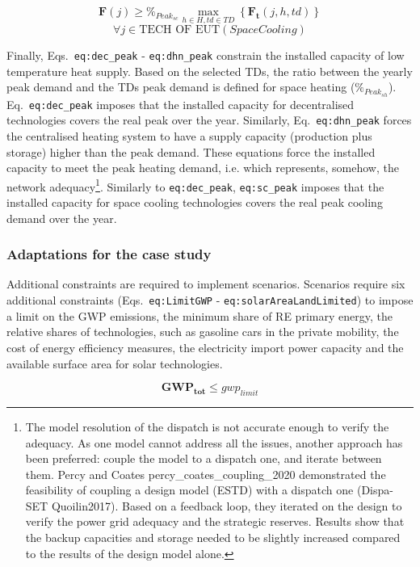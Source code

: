 \documentclass[
]{article}
\begin{document}
{\[\textbf{F} (j) 
\geq
\%_{Peak_{sc}}\max_{h\in H,td\in TD}\left\{\textbf{F}_\textbf{t}(j,h,td)\right\}\]\[\forall j \in \text{TECH OF  EUT} (SpaceCooling)\]}

Finally, Eqs.~\texttt{eq:dec\_peak} - \texttt{eq:dhn\_peak} constrain
the installed capacity of low temperature heat supply. Based on the
selected TDs, the ratio between the yearly peak demand and the TDs peak
demand is defined for space heating (\(\%_{Peak_{sh}}\)).
Eq.~\texttt{eq:dec\_peak} imposes that the installed capacity for
decentralised technologies covers the real peak over the year.
Similarly, Eq.~\texttt{eq:dhn\_peak} forces the centralised heating
system to have a supply capacity (production plus storage) higher than
the peak demand. These equations force the installed capacity to meet
the peak heating demand, i.e. which represents, somehow, the network
adequacy\footnote{The model resolution of the dispatch is not accurate
  enough to verify the adequacy. As one model cannot address all the
  issues, another approach has been preferred: couple the model to a
  dispatch one, and iterate between them. Percy and Coates
  percy\_coates\_coupling\_2020 demonstrated the feasibility of coupling
  a design model (ESTD) with a dispatch one (Dispa-SET Quoilin2017).
  Based on a feedback loop, they iterated on the design to verify the
  power grid adequacy and the strategic reserves. Results show that the
  backup capacities and storage needed to be slightly increased compared
  to the results of the design model alone.}. Similarly to
\texttt{eq:dec\_peak}, \texttt{eq:sc\_peak} imposes that the installed
capacity for space cooling technologies covers the real peak cooling
demand over the year.

\subsubsection{Adaptations for the case
study}\label{sssec_lp_adaptation_case_study}

Additional constraints are required to implement scenarios. Scenarios
require six additional constraints (Eqs.~\texttt{eq:LimitGWP} -
\texttt{eq:solarAreaLandLimited}) to impose a limit on the GWP
emissions, the minimum share of RE primary energy, the relative shares
of technologies, such as gasoline cars in the private mobility, the cost
of energy efficiency measures, the electricity import power capacity and
the available surface area for solar technologies.

{\[\textbf{GWP}_\textbf{tot} \leq gwp_{limit}\]}
\end{document}
